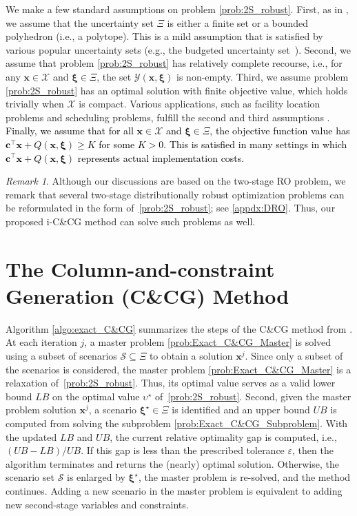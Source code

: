 \documentclass[preprint,review,11pt]{elsarticle}
\theoremstyle{definition}
\theoremstyle{remark}
\newtheorem{rem}{Remark}
\newcommand{\tp}{\top}
\newcommand{\calS}{\mathcal{S}}
\newcommand{\calX}{\mathcal{X}}
\newcommand{\calY}{\mathcal{Y}}
\newcommand{\xb}{\pmb{x}}
\newcommand{\cb}{\pmb{c}}
\newcommand{\xib}{\pmb{\xi}}
\newcommand{\blue}{\textcolor{black}}
\begin{document}
We make a few standard assumptions on problem \eqref{prob:2S_robust}. First, as in \cite{Zeng_Zhao:2013}, we assume that the uncertainty set $\Xi$ is either a finite set or a bounded polyhedron (i.e., a polytope). This is a mild assumption that is satisfied by various popular uncertainty sets (e.g., the budgeted uncertainty set~\cite{Bertsimas_Sim:2004}). Second, we assume that problem \eqref{prob:2S_robust} has relatively complete recourse, i.e., for any $\xb\in\calX$ and $\xib\in\Xi$, the set $\calY(\xb,\xib)$ is non-empty. Third, we assume problem \eqref{prob:2S_robust} has an optimal solution with finite objective value, which holds trivially when $\calX$ is compact. Various applications, such as facility location problems and scheduling problems, fulfill the second and third assumptions \citep{An_et_al:2014,Neyshabouri_Berg:2017}. \blue{Finally, we assume that for all $\xb\in\calX$ and $\xib\in\Xi$, the objective function value has $\cb^\tp\xb+Q(\xb,\xib) \geq K$ for some $K>0$. This is satisfied in many settings in which $\cb^\tp\xb+Q(\xb,\xib)$ represents actual implementation costs.}

\begin{rem}
Although our discussions are based on the two-stage RO problem, we remark that several two-stage distributionally robust optimization problems can be reformulated in the form of~\eqref{prob:2S_robust}; see \ref{appdx:DRO}. Thus, our proposed i-C\&CG method can solve such problems as well. 
\end{rem}




\section{The Column-and-constraint Generation (C\&CG) Method} \label{sec:exact_C&CG}

Algorithm \ref{algo:exact_C&CG} summarizes the steps of the C\&CG method from \cite{Zeng_Zhao:2013}. At each iteration $j$, a master problem \eqref{prob:Exact_C&CG_Master} is solved using a subset of scenarios $\calS\subseteq\Xi$ to obtain a solution $\xb^j$. Since only a subset of the scenarios is considered, the master problem \eqref{prob:Exact_C&CG_Master} is a relaxation of~\eqref{prob:2S_robust}.  Thus, its optimal value serves as a valid lower bound $LB$ on the optimal value $\upsilon^\star$ of~\eqref{prob:2S_robust}.  Second, given the master problem solution $\xb^j$, a scenario $\xib^\star\in\Xi$ is identified and an upper bound $UB$ is computed from solving the subproblem \eqref{prob:Exact_C&CG_Subproblem}. With the updated $LB$ and $UB$, the current relative optimality gap is computed, i.e., $(UB-LB)/UB$. If this gap is less than the prescribed tolerance $\varepsilon$, then the algorithm terminates and returns the (nearly) optimal solution.  Otherwise, the scenario set $\calS$ is enlarged by $\xib^\star$, the master problem is re-solved, and the method continues.  Adding a new scenario in the master problem is equivalent to adding new second-stage variables and constraints.
\end{document}
